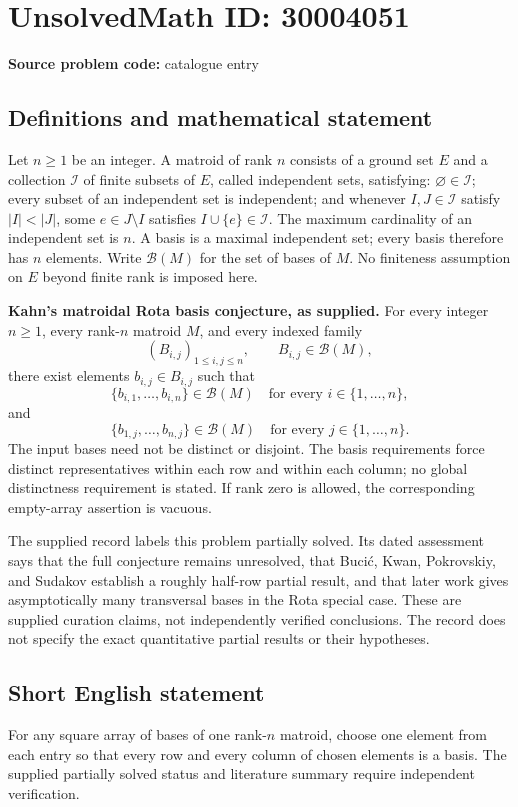 \documentclass[11pt]{article}
\begin{document}
\section*{UnsolvedMath ID: 30004051}
\textbf{Source problem code:} catalogue entry
\subsection{Definitions and mathematical statement}
Let \(n\geq 1\) be an integer. A matroid of rank \(n\) consists of a ground set \(E\) and a collection \(\mathcal I\) of finite subsets of \(E\), called independent sets, satisfying: \(\varnothing\in\mathcal I\); every subset of an independent set is independent; and whenever \(I,J\in\mathcal I\) satisfy \(|I|<|J|\), some \(e\in J\setminus I\) satisfies \(I\cup\{e\}\in\mathcal I\). The maximum cardinality of an independent set is \(n\). A basis is a maximal independent set; every basis therefore has \(n\) elements. Write \(\mathcal B(M)\) for the set of bases of \(M\). No finiteness assumption on \(E\) beyond finite rank is imposed here.

\textbf{Kahn's matroidal Rota basis conjecture, as supplied.} For every integer \(n\geq 1\), every rank-\(n\) matroid \(M\), and every indexed family
\[
(B_{i,j})_{1\leq i,j\leq n},\qquad B_{i,j}\in\mathcal B(M),
\]
there exist elements \(b_{i,j}\in B_{i,j}\) such that
\[
\{b_{i,1},\ldots,b_{i,n}\}\in\mathcal B(M)
\quad\text{for every }i\in\{1,\ldots,n\},
\]
and
\[
\{b_{1,j},\ldots,b_{n,j}\}\in\mathcal B(M)
\quad\text{for every }j\in\{1,\ldots,n\}.
\]
The input bases need not be distinct or disjoint. The basis requirements force distinct representatives within each row and within each column; no global distinctness requirement is stated. If rank zero is allowed, the corresponding empty-array assertion is vacuous.

The supplied record labels this problem partially solved. Its dated assessment says that the full conjecture remains unresolved, that Buci\'{c}, Kwan, Pokrovskiy, and Sudakov establish a roughly half-row partial result, and that later work gives asymptotically many transversal bases in the Rota special case. These are supplied curation claims, not independently verified conclusions. The record does not specify the exact quantitative partial results or their hypotheses.
\subsection{Short English statement}
For any square array of bases of one rank-\(n\) matroid, choose one element from each entry so that every row and every column of chosen elements is a basis. The supplied partially solved status and literature summary require independent verification.
\end{document}
